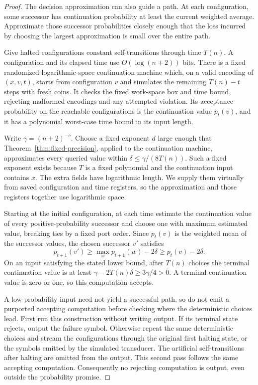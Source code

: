 \begin{proof}
The decision approximation can also guide a path. At each configuration, some successor has continuation probability at least the current weighted average. Approximate those successor probabilities closely enough that the loss incurred by choosing the largest approximation is small over the entire path.

Give halted configurations constant self-transitions through time
$T(n)$. A configuration and its elapsed time use $O(\log(n+2))$
bits. There is a fixed randomized logarithmic-space continuation
machine which, on a valid encoding of $(x,v,t)$, starts from
configuration $v$ and simulates the remaining $T(n)-t$ steps with
fresh coins. It checks the fixed work-space box and time bound,
rejecting malformed encodings and any attempted violation. Its
acceptance probability on the reachable configurations is the
continuation value $p_t(v)$, and it has a
polynomial worst-case time bound in its input length.

Write $\gamma=(n+2)^{-c}$. Choose a fixed exponent $d$ large enough
that Theorem~\ref{thm:fixed-precision}, applied to the continuation
machine, approximates every queried value within
$\delta\le\gamma/(8T(n))$. Such a fixed exponent exists because
$T$ is a fixed polynomial and the continuation input contains $x$.
The extra fields have logarithmic length. We supply them virtually
from saved configuration and time registers, so the approximation
and those registers together use logarithmic space.

Starting at the initial configuration, at each time estimate the
continuation value of every positive-probability successor and
choose one with maximum estimated value, breaking ties by a fixed
port order. Since $p_t(v)$ is the weighted mean of the successor
values, the chosen successor $v'$ satisfies
\[
 p_{t+1}(v')\ge\max_w p_{t+1}(w)-2\delta
                  \ge p_t(v)-2\delta.
\]
On an input satisfying the stated lower bound, after $T(n)$ choices
the terminal continuation value is at least
$\gamma-2T(n)\delta\ge3\gamma/4>0$. A terminal continuation value
is zero or one, so this computation accepts.

A low-probability input need not yield a successful path, so do not emit a purported accepting computation before checking where the deterministic choices lead. First run this construction without writing output. If its terminal
state rejects, output the failure symbol. Otherwise repeat the same
deterministic choices and stream the configurations through the original
first halting state, or the symbols emitted by the simulated transducer.
The artificial self-transitions after halting are omitted from the output.
This second pass follows the same accepting computation. Consequently no rejecting computation
is output, even outside the probability promise.


\end{proof}
